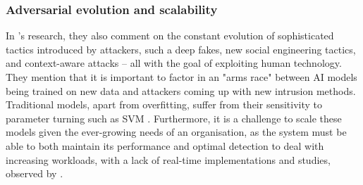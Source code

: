
\subsubsection*{Adversarial evolution and scalability}
In \cite{kapoor2024comparative}'s research, they also comment on the constant evolution of sophisticated tactics introduced by attackers, such a deep fakes, new social engineering tactics, and context-aware attacks -- all with the goal of exploiting human technology. They mention that it is important to factor in an "arms race" between AI models being trained on new data and attackers coming up with new intrusion methods. Traditional models, apart from overfitting, suffer from their sensitivity to parameter turning such as SVM \citep{andriu2023adaptive}. Furthermore, it is a challenge to scale these models given the ever-growing needs of an organisation, as the system must be able to both maintain its performance and optimal detection to deal with increasing workloads, with a lack of real-time implementations and studies, observed by \cite{atlam2022business}.
